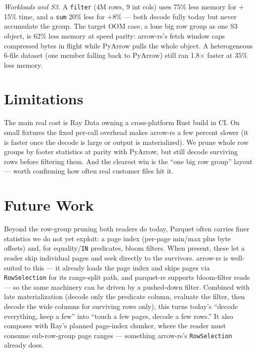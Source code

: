 \documentclass[10pt,twocolumn]{article}
\begin{document}
\emph{Workloads and S3.} A \texttt{filter} (4M rows, 9 int cols) uses 75\% less memory for
$+$15\% time, and a \texttt{sum} 20\% less for $+$8\% --- both decode fully today but never
accumulate the group. The target OOM case, a lone big row group as one S3 object, is 62\%
less memory at speed parity: arrow-rs's fetch window caps compressed bytes in flight while
PyArrow pulls the whole object. A
heterogeneous 6-file dataset (one member falling back to PyArrow) still ran 1.8$\times$
faster at 35\% less memory.

\section{Limitations}
The main real cost is Ray Data owning a cross-platform Rust build in CI. On small fixtures
the fixed per-call overhead makes arrow-rs a few percent slower (it is faster once the
decode is large or output is materialized). We prune whole row groups by footer statistics
at parity with PyArrow, but still decode surviving rows before filtering them. And the
clearest win is the ``one big row group'' layout --- worth confirming how often real
customer files hit it.

\section{Future Work}
Beyond the row-group pruning both readers do today, Parquet often carries finer statistics
we do not yet exploit: a page index (per-page min/max plus byte offsets) and, for
equality/\texttt{IN} predicates, bloom filters. When present, these let a reader skip
individual pages and seek directly to the survivors. arrow-rs is well-suited to this ---
it already loads the page index and skips pages via \texttt{RowSelection} for its
range-split path, and parquet-rs supports bloom-filter reads --- so the same machinery can
be driven by a pushed-down filter. Combined with late materialization (decode only the
predicate column, evaluate the filter, then decode the wide columns for surviving rows
only), this turns today's ``decode everything, keep a few'' into ``touch a few pages,
decode a few rows.'' It also composes with Ray's planned page-index chunker, where the
reader must consume sub-row-group page ranges --- something arrow-rs's \texttt{RowSelection}
already does.
\end{document}
